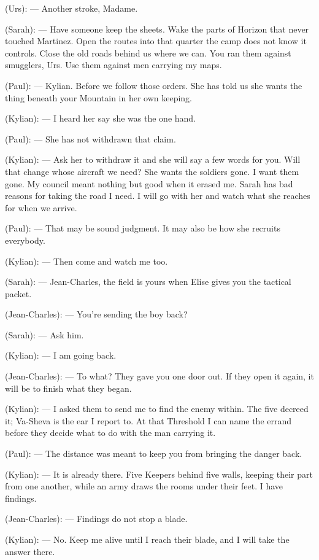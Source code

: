 \begin{room}
(Urs): --- Another stroke, Madame.

(Sarah): --- Have someone keep the sheets. Wake the parts of Horizon that never touched Martinez. Open the routes into that quarter the camp does not know it controls. Close the old roads behind us where we can. You ran them against smugglers, Urs. Use them against men carrying my maps.

\centerline{}

(Paul): --- Kylian. Before we follow those orders. She has told us she wants the thing beneath your Mountain in her own keeping.

(Kylian): --- I heard her say she was the one hand.

(Paul): --- She has not withdrawn that claim.

(Kylian): --- Ask her to withdraw it and she will say a few words for you. Will that change whose aircraft we need? She wants the soldiers gone. I want them gone. My council meant nothing but good when it erased me. Sarah has bad reasons for taking the road I need. I will go with her and watch what she reaches for when we arrive.

(Paul): --- That may be sound judgment. It may also be how she recruits everybody.

(Kylian): --- Then come and watch me too.

(Sarah): --- Jean-Charles, the field is yours when Elise gives you the tactical packet.

(Jean-Charles): --- You're sending the boy back?

(Sarah): --- Ask him.

(Kylian): --- I am going back.

(Jean-Charles): --- To what? They gave you one door out. If they open it again, it will be to finish what they began.

(Kylian): --- I asked them to send me to find the enemy within. The five decreed it; Va-Sheva is the ear I report to. At that Threshold I can name the errand before they decide what to do with the man carrying it.

(Paul): --- The distance was meant to keep you from bringing the danger back.

(Kylian): --- It is already there. Five Keepers behind five walls, keeping their part from one another, while an army draws the rooms under their feet. I have findings.

(Jean-Charles): --- Findings do not stop a blade.

(Kylian): --- No. Keep me alive until I reach their blade, and I will take the answer there.


\end{room}

